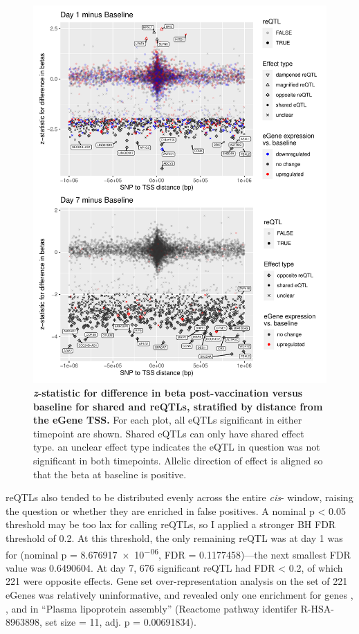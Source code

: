 \begin{figure}
    \centering
    \includegraphics[width=1.0\textwidth]{mainmatter/figures/chapter_03/compare_dge_eqtl.z_sharing.vs.SNP_gene_TSS_dist.pdf}
    \caption{
        \textbf{\textit{z}-statistic for difference in beta post-vaccination versus baseline for shared and \glspl{reQTL}, stratified by distance from the eGene \gls{TSS}.}
        For each plot, all \glspl{eQTL} significant in either timepoint are shown.
        Shared \glspl{eQTL} can only have shared effect type.
        an unclear effect type indicates the \gls{eQTL} in question was not significant in both timepoints.
        Allelic direction of effect is aligned so that the beta at baseline is positive. 
    }
    \label{fig:hird_eQTL_zSharing_vs_TSSdist_mega}
\end{figure}

\glspl{reQTL} also tended to be distributed evenly across the entire \textit{cis}- window,
raising the question or whether they are enriched in false positives.
A nominal p < 0.05 threshold may be too lax for calling \glspl{reQTL},
so I applied a stronger \gls{BH} \gls{FDR} threshold of 0.2.
At this threshold, the only remaining \gls{reQTL} was at day 1 was for  (nominal p = \num{8.676917e-06}, FDR = \num{0.1177458})---the next smallest FDR value was 0.6490604.
At day 7, 676 significant \gls{reQTL} had \gls{FDR} < 0.2, of which 221 were opposite effects.
Gene set over-representation analysis on the set of 221 eGenes was relatively uninformative, and revealed only one enrichment for genes , ,  and  in \enquote{Plasma lipoprotein assembly} (Reactome pathway identifer R-HSA-8963898, set size = 11, adj. p = \num{0.00691834}).

